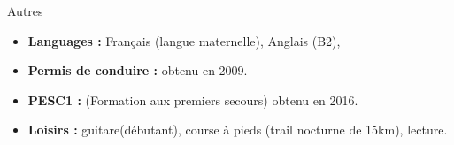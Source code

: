 \documentclass[10pt,a4paper]{report}
\def\sp{\vspace{6mm}}
\begin{document}
\sp
{\selectfont
\begin{Large}
Autres
\end{Large}
\hrulefill
}
\sp

\noindent
\begin{itemize}
\item \textbf{Languages :} Français (langue maternelle), Anglais (B2),
\item \textbf{Permis de conduire :} obtenu en 2009.
\item \textbf{PESC1 :} (Formation aux premiers secours) obtenu en 2016.
\item \textbf{Loisirs :} guitare(débutant), course à pieds (trail nocturne de 15km), lecture.
\end{itemize}
\end{document}
